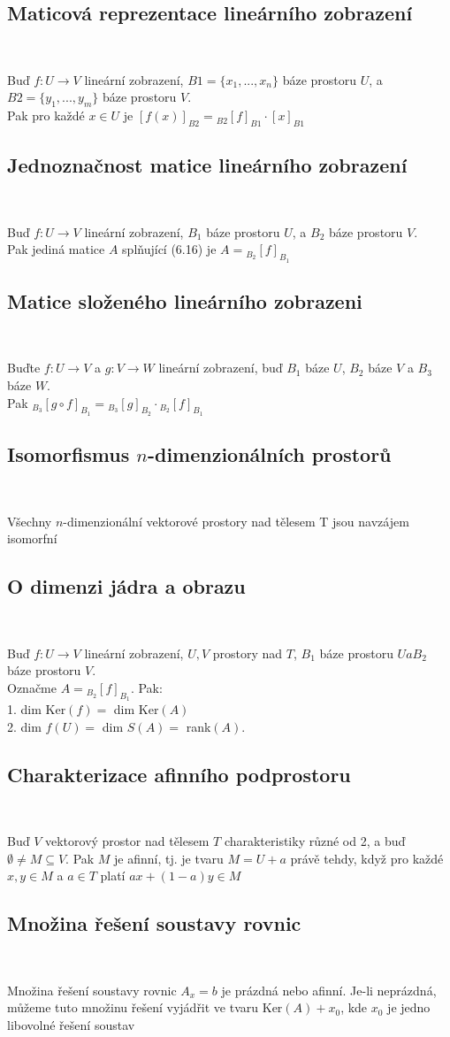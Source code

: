 \documentclass[a4paper]{article}
\newcommand{\asubsection}[3]{
	\setcounter{section}{#1}
	\setcounter{subsection}{#2}
	\addtocounter{subsection}{-1}
	\subsection{#3}~
}
\begin{document}
\asubsection{6}{16}{Maticová reprezentace lineárního zobrazení}
Buď $f : U \rightarrow V$ lineární zobrazení,
$B1 = \{x_1, . . . , x_n\}$ báze prostoru $U$, a
$B2 = \{y_1, . . . , y_m\}$ báze prostoru $V$. \\
Pak pro každé $x \in U$ je $[f(x)]_{B2} = {}_{B2}[f]_{B1} \cdot [x]_{B1}$


\asubsection{6}{18}{Jednoznačnost matice lineárního zobrazení}
Buď $f : U \rightarrow V$ lineární zobrazení,
$B_1$ báze prostoru $U$, a $B_2$ báze prostoru $V$. \\
Pak jediná matice $A$ splňující (6.16) je $A = {}_{B_2}[f]_{B_1}$


\asubsection{6}{24}{Matice složeného lineárního zobrazeni}
Buďte $f : U \rightarrow V$ a $g : V \rightarrow W$ lineární zobrazení,
buď $B_1$ báze $U$, $B_2$ báze $V$ a $B_3$ báze $W$. \\
Pak $ {}_{B_3}[g \circ f]_{B_1} = {}_{B_3}[g]_{B_2} \cdot {}_{B_2}[f]_{B_1}$


\asubsection{6}{35}{Isomorfismus $n$-dimenzionálních prostorů}
Všechny $n$-dimenzionální vektorové prostory nad tělesem T jsou navzájem isomorfní


\asubsection{6}{37}{O dimenzi jádra a obrazu}
Buď $f : U \rightarrow V$ lineární zobrazení,
$U, V$ prostory nad $T$, $B_1$ báze prostoru $U a B_2$ báze prostoru $V$. \\
Označme $A = {}_{B_2}[f]_{B_1}$.
Pak: \\
1. dim Ker$(f) = $ dim Ker$(A)$ \\
2. dim $f(U) = $ dim $S(A) = $ rank$(A)$.


\asubsection{7}{4}{Charakterizace afinního podprostoru}
Buď $V$ vektorový prostor nad tělesem $T$ charakteristiky různé od 2,
a buď $\emptyset \neq M \subseteq V$.
Pak $M$ je afinní, tj. je tvaru $M = U + a$ právě tehdy, když pro každé
$x, y \in M$ a $a \in T$ platí $ax + (1 - a)y \in M$

\asubsection{7}{5}{Množina řešení soustavy rovnic}
Množina řešení soustavy rovnic $A_x = b$ je prázdná nebo afinní.
Je-li neprázdná, můžeme tuto množinu řešení vyjádřit ve
tvaru Ker$(A) + x_0$, kde $x_0$ je jedno libovolné řešení soustav
\end{document}

